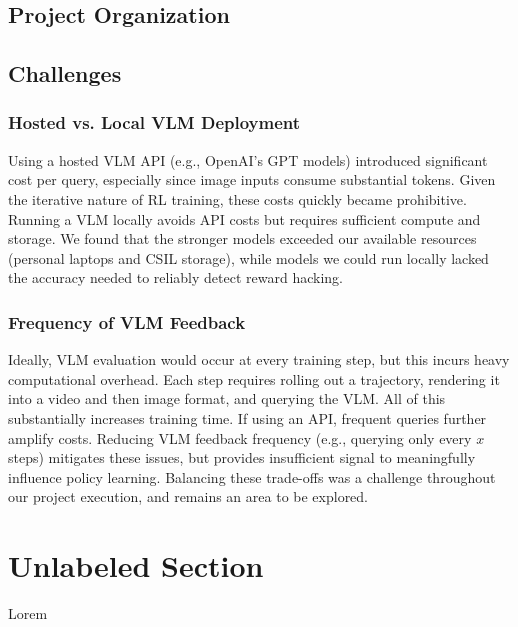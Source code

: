 \documentclass{article}
\begin{document}
\subsection{Project Organization}

\subsection{Challenges}
\subsubsection{Hosted vs. Local VLM Deployment}
Using a hosted VLM API (e.g., OpenAI's GPT models) introduced significant cost per query, especially since image inputs consume substantial tokens. Given the iterative nature of RL training, these costs quickly became prohibitive. Running a VLM locally avoids API costs but requires sufficient compute and storage. We found that the stronger models exceeded our available resources (personal laptops and CSIL storage), while models we could run locally lacked the accuracy needed to reliably detect reward hacking.

\subsubsection{Frequency of VLM Feedback}
Ideally, VLM evaluation would occur at every training step, but this incurs heavy computational overhead. Each step requires rolling out a trajectory, rendering it into a video and then image format, and querying the VLM. All of this substantially increases training time. If using an API, frequent queries further amplify costs. Reducing VLM feedback frequency (e.g., querying only every $x$ steps) mitigates these issues, but provides insufficient signal to meaningfully influence policy learning. Balancing these trade-offs was a challenge throughout our project execution, and remains an area to be explored.


\section*{Unlabeled Section}
Lorem


 
\end{document}
